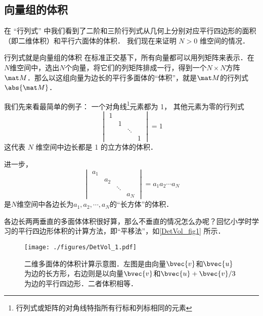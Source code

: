 
\begin{issues}
\issueDraft
\end{issues}


\subsection{向量组的体积}

在 “行列式” 中我们看到了二阶和三阶行列式从几何上分别对应平行四边形的面积（即二维体积）和平行六面体的体积． 我们现在来证明 $N > 0$ 维空间的情况．

\begin{theorem}{行列式就是向量组的体积}
在标准正交基下，所有向量都可以用列矩阵来表示．在$N$维空间中，选出$N$个向量，将它们的列矩阵排成一行，得到一个$N\times N$方阵$\mat M$．那么以这组向量为边长的平行多面体的“体积”，就是$\mat M$的行列式$\abs{\mat M}$．
\end{theorem}


我们先来看最简单的例子： 一个对角线\footnote{行列式或矩阵的对角线特指所有行标和列标相同的元素}元素都为 1， 其他元素为零的行列式
\begin{equation}
\begin{vmatrix}
1 & & &\\
  & 1 & &\\
  &  & \ddots &\\
  & & & 1
\end{vmatrix} = 1
\end{equation}
这代表 $N$ 维空间中边长都是 1 的立方体的体积．

进一步，
\begin{equation}
\begin{vmatrix}
a_1 & & &\\
  & a_2 & &\\
  &  & \ddots &\\
  & & & a_N
\end{vmatrix} = a_1a_2\cdots a_N
\end{equation}
是$N$维空间中各边长为$a_1, a_2, \cdots, a_N$的“长方体”的体积．

各边长两两垂直的多面体体积很好算，那么不垂直的情况怎么办呢？回忆小学时学习的平行四边形体积的计算方法，即“平移法”，如\autoref{DetVol_fig1} 所示．
\begin{figure}[ht]
\centering
\texttt{[image: ./figures/DetVol\_1.pdf]}
\caption{二维多面体的体积计算示意图．左图是由向量$\bvec{v}$和$\bvec{u}$为边的长方形，右边则是以向量$\bvec{v}$和$\bvec{u}+\bvec{v}/3$为边的平行四边形．二者体积相等．} \label{DetVol_fig1}
\end{figure}

